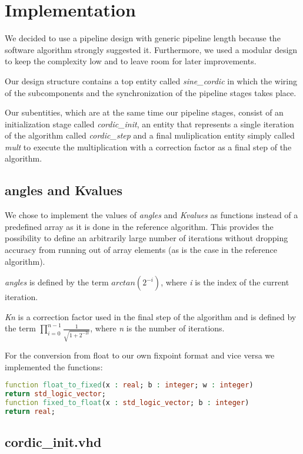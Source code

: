 \section{Implementation}
We decided to use a pipeline design with generic pipeline length because the software algorithm strongly suggested it. Furthermore, we used a modular design to keep the complexity low and to leave room for later improvements.

Our design structure contains a top entity called \textit{sine\_cordic} in which the wiring of the subcomponents and the synchronization of the pipeline stages takes place.

Our subentities, which are at the same time our pipeline stages, consist of an initialization stage called \textit{cordic\_init}, an entity that represents a single iteration of the algorithm called \textit{cordic\_step} and a final muliplication entity simply called \textit{mult} to execute the multiplication with a correction factor as a final step of the algorithm. 

\subsection{angles and Kvalues}

We chose to implement the values of \textit{angles} and \textit{Kvalues}  as functions
instead of a predefined array as it is done in the reference algorithm. This provides the possibility to define an arbitrarily large number of iterations without dropping accuracy from running out of array elements (as is the case in the reference algorithm).

\textit{angles} is defined by the term \(arctan(2^{-i})\), where \textit{i} is the index of the current iteration. 

\textit{Kn} is a correction factor used in the final step of the algorithm and is defined by the term $\prod\limits_{i=0}^{n-1}\frac{1}{\sqrt{1+2^{-2i}}}$, where \textit{n} is the number of iterations.

For the conversion from float to our own fixpoint format and vice versa we implemented the functions:

\begin{lstlisting}[language=VHDL]
function float_to_fixed(x : real; b : integer; w : integer) 
return std_logic_vector;
function fixed_to_float(x : std_logic_vector; b : integer) 
return real;
\end{lstlisting}

\subsection{cordic\_init.vhd}

